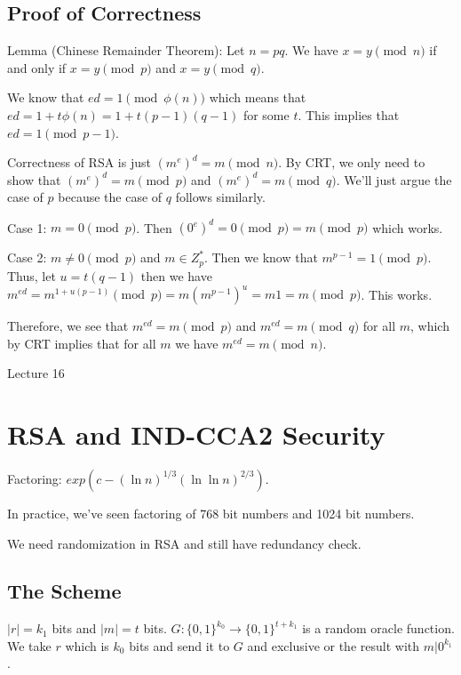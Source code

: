 \documentclass[psamsfonts]{amsart}
\begin{document}
\subsection{Proof of Correctness}

Lemma (Chinese Remainder Theorem): Let $n = pq$. We have $x = y \pmod{n}$ if and only if $x = y \pmod{p}$ and $x = y \pmod{q}$.

We know that $ed = 1 \pmod{\phi(n)}$ which means that $ed = 1 + t \phi(n) = 1 + t(p-1)(q-1)$ for some $t$. This implies that $ed = 1 \pmod{p-1}$.

Correctness of RSA is just $(m^e)^d = m \pmod{n}$. By CRT, we only need to show that $(m^e)^d = m \pmod{p}$ and $(m^e)^d = m \pmod{q}$. We'll just argue the case of $p$ because the case of $q$ follows similarly.

Case 1: $m = 0 \pmod{p}$. Then $(0^e)^d = 0 \pmod{p} = m \pmod{p}$ which works.

Case 2: $m \neq 0 \pmod{p}$ and $m \in Z_p^*$. Then we know that $m^{p-1} = 1 \pmod{p}$. Thus, let $u = t(q-1)$ then we have $m^{ed} = m^{1 + u(p-1)} \pmod{p} = m (m^{p-1})^u = m 1 = m \pmod{p}$. This works.

Therefore, we see that $m^{ed} = m \pmod{p}$ and $m^{ed} = m \pmod{q}$ for all $m$, which by CRT implies that for all $m$ we have $m^{ed} = m \pmod{n}$.

\newpage
\Large{Lecture 16}


\maketitle

\section{RSA and IND-CCA2 Security}

Factoring: $exp( c - (\ln n)^{1/3} (\ln \ln n)^{2/3} )$.

In practice, we've seen factoring of 768 bit numbers and 1024 bit numbers.

We need randomization in RSA and still have redundancy check.

\subsection{The Scheme}

$|r| = k_1$ bits and $|m| = t$ bits. $G: \{0, 1\}^{k_0} \to \{0,1\}^{t + k_1}$ is a random oracle function. We take $r$ which is $k_0$ bits and send it to $G$ and exclusive or the result with $m | 0^{k_1}$.
\end{document}
